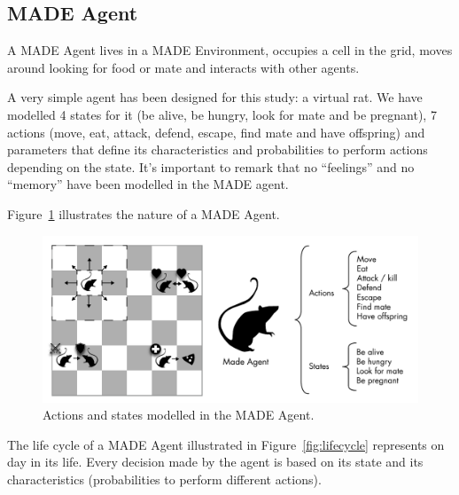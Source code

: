 \documentclass[runningheads]{llncs}
\begin{document}



\subsection{MADE Agent}
A MADE Agent lives in a MADE Environment, occupies a cell in the grid, moves around looking for food or mate and interacts with other agents.

A very simple agent has been designed for this study: a virtual rat. We have modelled 4 states for it (be alive, be hungry, look for mate and be pregnant), 7 actions (move, eat, attack, defend, escape, find mate and have offspring) and parameters that define its characteristics and probabilities to perform actions depending on the state. It's important to remark that no ``feelings'' and no ``memory'' have been modelled in the MADE agent.

Figure~\ref{fig:madeAgent} illustrates the nature of a MADE Agent.

\begin{figure}
\begin{center}
\includegraphics[scale=0.65]{img/MadeAgent.pdf}
\caption{Actions and states modelled in the MADE Agent.}
\label{fig:madeAgent}
\end{center}
\end{figure}

The life cycle of a MADE Agent illustrated in Figure~\ref{fig:lifecycle} represents on day in its life. Every decision made by the agent is based on its state and its characteristics (probabilities to perform different actions).
\end{document}
